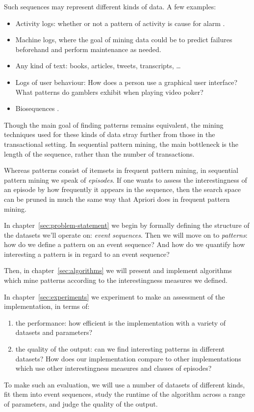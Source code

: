 Such sequences may represent different kinds of data. A few examples:
\begin{itemize}
\item Activity logs: whether or not a pattern of activity is cause for alarm \cite{mannila1997discovery}.
\item Machine logs, where the goal of mining data could be to predict failures beforehand and perform maintenance as needed.
\item Any kind of text: books, articles, tweets, transcripts, \ldots
\item Logs of user behaviour: How does a person use a graphical user interface? What patterns do gamblers exhibit when playing video poker?
\item Biosequences \cite{biosequences}.
\end{itemize}

Though the main goal of finding patterns remains equivalent, the mining techniques used for these kinds of data stray further from those in the transactional setting. In sequential pattern mining, the main bottleneck is the length of the sequence, rather than the number of transactions.

Whereas patterns consist of itemsets in frequent pattern mining, in sequential pattern mining we speak of \emph{episodes}. If one wants to assess the interestingness of an episode by how frequently it appears in the sequence, then the search space can be pruned in much the same way that Apriori does in frequent pattern mining.

In chapter~\ref{sec:problem-statement} we begin by formally defining the structure of the datasets we'll operate on: \emph{event sequences}. Then we will move on to \emph{patterns}: how do we define a pattern on an event sequence?
And how do we quantify how interesting a pattern is in regard to an event sequence?

Then, in chapter~\ref{sec:algorithms} we will present and implement algorithms which mine patterns according to the interestingness measures we defined.

In chapter~\ref{sec:experiments} we experiment to make an assessment of the implementation, in terms of:

\begin{enumerate}
\item the performance: how efficient is the implementation with a variety of datasets and parameters?
\item the quality of the output: can we find interesting patterns in different datasets? How does our implementation compare to other implementations which use other interestingness measures and classes of episodes?
\end{enumerate}

To make such an evaluation, we will use a number of datasets of different kinds, fit them into event sequences, study the runtime of the algorithm across a range of parameters, and judge the quality of the output.
